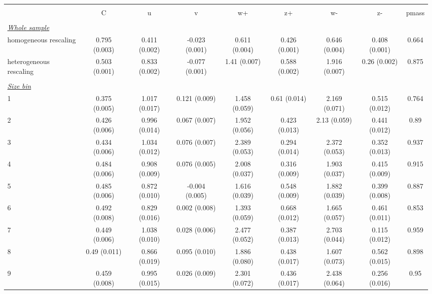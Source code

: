 
\begin{tabular}{@{\extracolsep{5pt}} l cccccccc} 
\\[-1.8ex]\hline 
\hline \\[-1.8ex] 
  & C & u & v & w+ & z+ & w- & z- & pmass \\ 
\hline \\[-1.8ex] 
\underline{{\it Whole sample}} &   &   &   &   &   &   &   &  \\ 
homogeneous rescaling & 0.795 (0.003) & 0.411 (0.002) & -0.023 (0.001) & 0.611 (0.004) & 0.426 (0.001) & 0.646 (0.004) & 0.408 (0.001) & 0.664 \\ 
heterogeneous rescaling & 0.503 (0.001) & 0.833 (0.002) & -0.077 (0.001) & 1.41 (0.007) & 0.588 (0.002) & 1.916 (0.007) & 0.26 (0.002) & 0.875 \\ 
 &   &   &   &   &   &   &   &  \\ 
\underline{{\it Size bin}} &   &   &   &   &   &   &   &  \\ 
1 & 0.375 (0.005) & 1.017 (0.017) & 0.121 (0.009) & 1.458 (0.059) & 0.61 (0.014) & 2.169 (0.071) & 0.515 (0.012) & 0.764 \\ 
2 & 0.426 (0.006) & 0.996 (0.014) & 0.067 (0.007) & 1.952 (0.056) & 0.423 (0.013) & 2.13 (0.059) & 0.441 (0.012) & 0.89 \\ 
3 & 0.434 (0.006) & 1.034 (0.012) & 0.076 (0.007) & 2.389 (0.053) & 0.294 (0.014) & 2.372 (0.053) & 0.352 (0.013) & 0.937 \\ 
4 & 0.484 (0.006) & 0.908 (0.009) & 0.076 (0.005) & 2.008 (0.037) & 0.316 (0.009) & 1.903 (0.037) & 0.415 (0.009) & 0.915 \\ 
5 & 0.485 (0.006) & 0.872 (0.010) & -0.004 (0.005) & 1.616 (0.039) & 0.548 (0.009) & 1.882 (0.039) & 0.399 (0.008) & 0.887 \\ 
6 & 0.492 (0.008) & 0.829 (0.016) & 0.002 (0.008) & 1.393 (0.059) & 0.668 (0.012) & 1.665 (0.057) & 0.461 (0.011) & 0.853 \\ 
7 & 0.449 (0.006) & 1.038 (0.010) & 0.028 (0.006) & 2.477 (0.052) & 0.387 (0.013) & 2.703 (0.044) & 0.115 (0.012) & 0.959 \\ 
8 & 0.49 (0.011) & 0.866 (0.019) & 0.095 (0.010) & 1.886 (0.080) & 0.438 (0.017) & 1.607 (0.073) & 0.562 (0.015) & 0.898 \\ 
9 & 0.459 (0.008) & 0.995 (0.015) & 0.026 (0.009) & 2.301 (0.072) & 0.436 (0.017) & 2.438 (0.064) & 0.256 (0.016) & 0.95 \\ 

\end{tabular}
